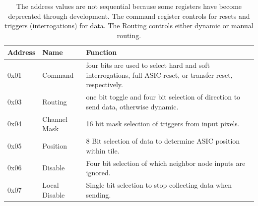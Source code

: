 \begin{table}
\begin{center}
\begin{tabular}{||p{30mm} p{30mm} p{90mm}||}
 \hline
 Address & Name & Function \\ [0.5ex]
 \hline\hline
  0x01 & Command & four bits are used to select hard and soft interrogations, full ASIC reset, or transfer reset, respectively. \\
 \hline
  0x03 & Routing & one bit toggle and four bit selection of direction to send data, otherwise dynamic. \\
 \hline
  0x04 & Channel Mask & 16 bit mask selection of triggers from input pixels. \\
 \hline
  0x05 & Position & 8 Bit selection of data to determine ASIC position within tile. \\
 \hline
  0x06 & Disable & Four bit selection of which neighbor node inputs are ignored. \\
 \hline
  0x07 & Local Disable & Single bit selection to stop collecting data when sending. \\
 \hline
\end{tabular}
\caption{The address values are not sequential because some registers have become deprecated through development.
The command register controls for resets and triggers (interrogations) for data.
The Routing controls either dynamic or manual routing.
}
\label{table:node_registers}
\end{center}
\end{table}


